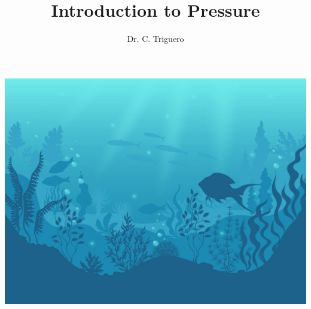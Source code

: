 \documentclass[usenames,dvipsnames]{beamer}
\title[Moment]{\Huge{Introduction to Pressure}}
\author{Dr. C. Triguero} %
\institute[ASC]%
{
\medskip
\textit{ctriguero274@c2ken.net} %
}
\begin{document}

\begin{frame}[plain]
\includegraphics[keepaspectratio=true,width=0.85\paperwidth,overlay]{Images/sea.png}
\end{frame}

    
    
    
    
    
    


\begin{frame}
\titlepage
\end{frame}
\end{document}
